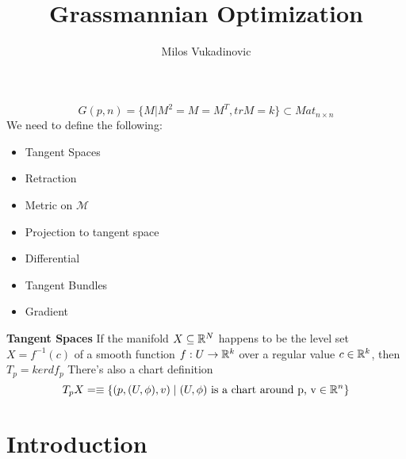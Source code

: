\documentclass[11pt,a4paper]{report}
\author{Milos Vukadinovic}
\title{Grassmannian Optimization}
\begin{document}
\maketitle
\setcounter{tocdepth}{1}
\tableofcontents
$$ G(p,n) = \{ M | M^2 = M = M^T, tr M = k \} \subset Mat_{n \times n}$$
We need to define the following:
\begin{itemize}
      \item Tangent Spaces
      \item Retraction
      \item Metric on $\mathcal{M}$
      \item Projection to tangent space
      \item Differential
      \item Tangent Bundles
      \item Gradient
\end{itemize}
\textbf{Tangent Spaces}
If the manifold $X \subseteq \mathbb{R}^N$ happens to be the level set $X = f^{-1}(c)$ of a smooth function
$f: U \to \mathbb{R}^k$ over a regular value $c \in \mathbb{R}^k$, then $T_p = ker df_p$
There's also a chart definition
$$ T_p X = \equiv{\{ (p,(U,\phi),v) \;|\; (U,\phi) \text{ is a chart around p, v} \in \mathbb{R}^n \}} $$
      \chapter{Introduction}
      \cite{chatterjee_thesis}
 
 
 
 
 
 
 
 
 
 
 


 
 
\end{document}
